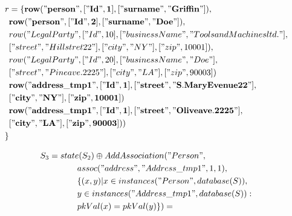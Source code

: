 \documentclass[11pt]{article}
\begin{document}
\begin{align*}
r &=\{ \mathbf{row("person", ["Id", 1], ["surname", "Griffin"])}, \\
& \mathbf{row("person", ["Id", 2], ["surname", "Doe"])}, \\
& row("LegalParty", ["Id", 10], ["businessName", "Tools and Machines ltd."], \\
& ["street", "Hill stret 22"], ["city", "NY"], ["zip", 10001]), \\
& row("LegalParty", ["Id", 20], ["businessName", "Doe"], \\
& ["street", "Pine ave. 2225"], ["city", "LA"], ["zip", 90003])\\
& \mathbf{row("address\_tmp1", ["Id", 1], ["street", "S. Mary Evenue 22"],} \\
& \mathbf{["city", "NY"], ["zip", 10001])} \\
& \mathbf{row("address\_tmp1", ["Id", 1], ["street", "Olive ave. 2225"],} \\
& \mathbf{ ["city", "LA"], ["zip", 90003])} )\\
\}
\end{align*}

\newpage
\begin{align*}
	S_3 &= state(S_2) \oplus AddAssociation("Person", \\ 
& \;\;\;\;\;\;\;\;\;\;\;\; assoc("address", "Address\_tmp1", 1, 1),\\ 
& \;\;\;\;\;\;\;\;\;\;\;\; \{(x,y)| x \in instances("Person", database(S)), \\
& \;\;\;\;\;\; \;\;\;\;\;\; y \in instances("Address\_tmp1", database(S)) : \\ 
& \;\;\;\;\;\;\;\;\;\;\;\; pkVal(x) = pkVal(y) \}) = \\
\end{align*}
\end{document}

